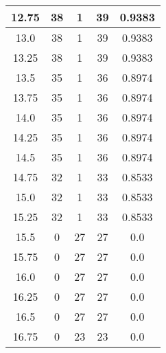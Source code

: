 \documentclass[letterpaper, 12pt]{article}
\begin{document}
\begin{longtable}{|c|c|c|c|c|}
\hline
12.75 & 38 & 1 & 39 & 0.9383 \\
\hline
13.0 & 38 & 1 & 39 & 0.9383 \\
\hline
13.25 & 38 & 1 & 39 & 0.9383 \\
\hline
13.5 & 35 & 1 & 36 & 0.8974 \\
\hline
13.75 & 35 & 1 & 36 & 0.8974 \\
\hline
14.0 & 35 & 1 & 36 & 0.8974 \\
\hline
14.25 & 35 & 1 & 36 & 0.8974 \\
\hline
14.5 & 35 & 1 & 36 & 0.8974 \\
\hline
14.75 & 32 & 1 & 33 & 0.8533 \\
\hline
15.0 & 32 & 1 & 33 & 0.8533 \\
\hline
15.25 & 32 & 1 & 33 & 0.8533 \\
\hline
15.5 & 0 & 27 & 27 & 0.0 \\
\hline
15.75 & 0 & 27 & 27 & 0.0 \\
\hline
16.0 & 0 & 27 & 27 & 0.0 \\
\hline
16.25 & 0 & 27 & 27 & 0.0 \\
\hline
16.5 & 0 & 27 & 27 & 0.0 \\
\hline
16.75 & 0 & 23 & 23 & 0.0 \\
\hline
\end{longtable}
\end{document}
